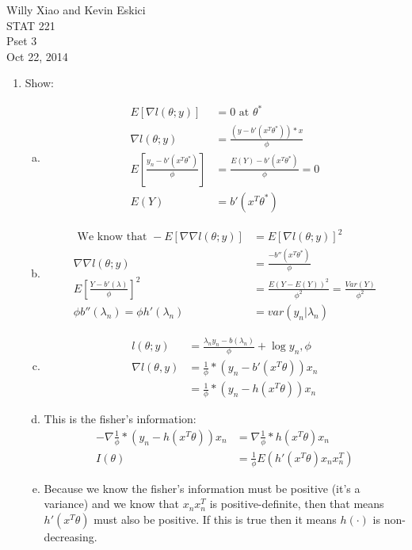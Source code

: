 \documentclass[paper=a4, fontsize=11pt]{scrartcl}
\begin{document}
\noindent Willy Xiao and Kevin Eskici \\ STAT 221 \\Pset 3\\ Oct 22, 2014
\begin{enumerate}
  \item Show: \\
    \begin{enumerate}[(a)]
      \item \begin{align*}
        E\left[ \nabla l(\theta; y) \right] &= 0 \text{ at }\theta^* \\
        \nabla l(\theta; y) &= \frac{(y - b'(x^T\theta^*))*x}{\phi} \\
        E\left[ \frac{y_n - b'(x^T\theta^*)}{\phi} \right] &= \frac{E(Y) - b'(x^T\theta^*)}{\phi} = 0 \\
        E(Y) &= b'(x^T\theta^*)
      \end{align*}
      \item \begin{align*}
        \text{ We know that } -E\left[ \nabla \nabla l(\theta; y) \right] &= E\left[ \nabla l(\theta; y) \right]^2 \\
        \nabla \nabla l(\theta; y) &= \frac{-b''(x^T\theta^*)}{\phi} \\
        E\left[ \frac{Y - b'(\lambda)}{\phi} \right]^2 &= \frac{E(Y - E(Y))^2}{\phi^2} = \frac{Var(Y)}{\phi^2} \\
        \phi b''(\lambda_n) = \phi h'(\lambda_n) &= var(y_n|\lambda_n)
      \end{align*}
      \item \begin{align*}
        l(\theta; y) &= \frac{\lambda_ny_n - b(\lambda_n)}{\phi} + \log{y_n, \phi} \\
        \nabla l(\theta, y) &= \frac{1}{\phi}*(y_n - b'(x^T\theta))x_n \\
          &= \frac{1}{\phi}*(y_n - h(x^T\theta))x_n
      \end{align*}
      \item This is the fisher's information:
        \begin{align*}
          - \nabla \frac{1}{\phi}*(y_n - h(x^T\theta))x_n &= \nabla \frac{1}{\phi}*h(x^T\theta)x_n \\
          I(\theta) &= \frac{1}{\phi} E(h'(x^T\theta)x_nx_n^T)
        \end{align*}
      \item Because we know the fisher's information must be positive (it's a variance) and we know that $x_nx_n^T$ is positive-definite, then that means $h'(x^T\theta)$ must also be positive. If this is true then it means $h(\cdot)$ is non-decreasing.

\end{enumerate}
\end{enumerate}
\end{document}
